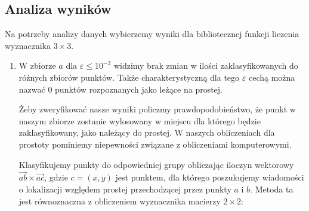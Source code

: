\subsection{Analiza wyników}
\quad Na potrzeby analizy danych wybierzemy wyniki dla bibliotecznej 
funkcji liczenia wyznacznika $3 \times 3$.
\begin{enumerate}
    \item \quad W zbiorze $a$ dla $\varepsilon \leq 10^{-2}$ widzimy brak zmian 
w ilości zaklasyfikowanych do różnych zbiorów punktów. Także charakterystyczną dla tego $\varepsilon$ 
cechą można nazwać $0$ punktów rozpoznanych jako leżące na prostej.\par
\quad Żeby zweryfikować nasze wyniki policzmy prawdopodobieństwo, że punkt w naszym zbiorze zostanie 
wylosowany w miejscu dla którego będzie zaklasyfikowany, jako należący do prostej. 
W naszych obliczeniach dla prostoty pominiemy niepewności związane z obliczeniami komputerowymi.\par
\quad Klasyfikujemy punkty do odpowiedniej grupy obliczając iloczyn wektorowy
$\overrightarrow{ab} \times \overrightarrow{ac}$, gdzie $ c = (x,y)$ jest punktem, dla którego poszukujemy wiadomości o lokalizacji względem prostej przechodzącej przez punkty $ a$ i $ b$. Metoda ta jest równoznaczna z obliczeniem wyznacznika macierzy $ 2\times2$:  


\end{enumerate}
